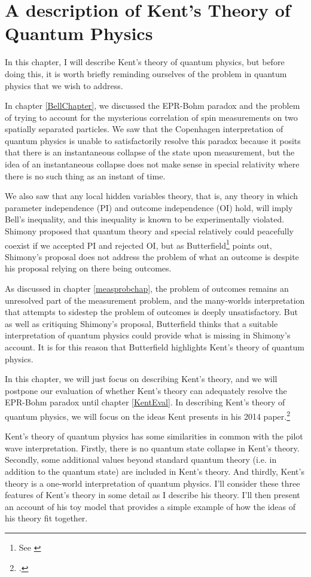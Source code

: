 \chapter{A description of Kent's Theory of Quantum Physics\label{kentchapterdesc}}

In this chapter, I will describe Kent's theory of quantum physics, but before doing this, it is worth briefly reminding ourselves of the problem in quantum physics that we wish to address. 

In chapter \ref{BellChapter}, we discussed the EPR-Bohm paradox and the problem of trying to account for the mysterious correlation of spin measurements on two spatially separated particles. We saw that the Copenhagen interpretation of quantum physics is unable to satisfactorily resolve this paradox because it posits that there is an instantaneous collapse of the state upon measurement, but the idea of an instantaneous collapse does not make sense in special relativity where there is no such thing as an instant of time. 

We also saw that any local hidden variables theory, that is, any theory in which parameter independence (PI) and outcome independence (OI) hold, will imply Bell's inequality, and this inequality is known to be experimentally violated. Shimony proposed that quantum theory and special relatively could peacefully coexist if we accepted PI and rejected OI, but as Butterfield\footnote{See \cite{Butterfield}} points out, Shimony's proposal  does not address the problem of what an outcome is despite his proposal relying on there being outcomes. 

As discussed in chapter \ref{measprobchap}, the problem of outcomes remains an unresolved part of the measurement problem, and the many-worlds interpretation that attempts to sidestep the problem of outcomes is deeply unsatisfactory. But as well as critiquing Shimony's proposal, Butterfield thinks that a suitable interpretation of quantum physics could provide what is missing in Shimony's account. It is for this reason that Butterfield highlights Kent's theory of quantum physics.

In this chapter, we will just focus on describing Kent's theory, and we will postpone our evaluation of whether Kent's theory can adequately resolve the EPR-Bohm paradox until chapter \ref{KentEval}. In describing Kent's theory of quantum physics, we will focus on the ideas Kent presents in his 2014 paper.\footnote{\cite{Kent2014}.} 

Kent's theory of quantum physics has some similarities in common with the pilot wave interpretation. Firstly,  there is no quantum state collapse in Kent's theory. Secondly, some additional values beyond standard quantum theory (i.e. in addition to the quantum state) are included in Kent's theory. And thirdly, Kent's theory is a one-world interpretation of quantum physics. I'll consider these three features of Kent's theory in some detail as I describe his theory. I'll then present an account of his toy model that provides a simple example of how the ideas of his theory fit together. 